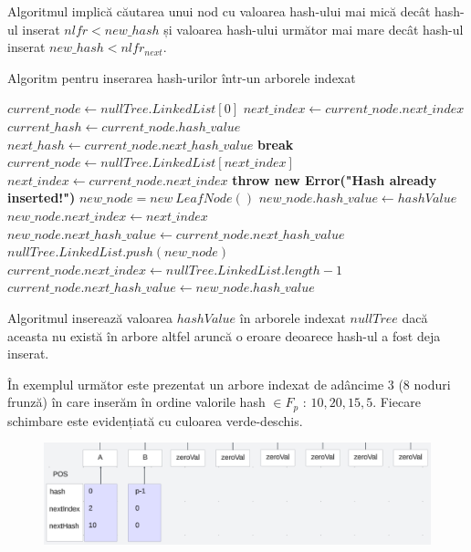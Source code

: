 \documentclass[12pt, letterpaper]{article}
\begin{document}
Algoritmul implică căutarea unui nod cu valoarea hash-ului mai mică decât hash-ul inserat $nlfr < new\_hash$ și valoarea hash-ului următor mai mare decât hash-ul inserat $new\_hash < nlfr_{next}$.

\begin{algorithm}
    \caption{Algoritm pentru inserarea hash-urilor într-un arborele indexat}
    \label{index_tree_hash_insert_alg}
    \begin{algorithmic}[1]
            \State $current\_node \gets nullTree.LinkedList[0]$
            \State $next\_index \gets current\_node.next\_index$ 
                \State $current\_hash \gets current\_node.hash\_value$
                \State $next\_hash \gets current\_node.next\_hash\_value$
                  \State \textbf{break}
                \Else 
                \State $current\_node\gets nullTree.LinkedList[next\_index]$
                \State $next\_index \gets current\_node.next\_index$ 
                \EndIf
            \EndWhile
                \State \textbf{throw new Error("Hash already inserted!")}
            \Else 
                \State $new\_node = new\ LeafNode()$
                \State $new\_node.hash\_value\gets hashValue$
                \State $new\_node.next\_index\gets next\_index$
                \State $new\_node.next\_hash\_value\gets current\_node.next\_hash\_value$
                \State $nullTree.LinkedList.push(new\_node)$
                \State $current\_node.next\_index\gets nullTree.LinkedList.length-1$
                \State $current\_node.next\_hash\_value\gets new\_node.hash\_value$      
            \EndIf
        \EndFunction
    \end{algorithmic}
\end{algorithm}

Algoritmul inserează valoarea $hashValue$ în arborele indexat $nullTree$ dacă aceasta nu există în arbore altfel aruncă o eroare deoarece hash-ul a fost deja inserat.

În exemplul următor este prezentat un arbore indexat de adâncime 3 (8 noduri frunză) în care inserăm în ordine valorile hash $\in F_p$ : $10,20,15,5$. Fiecare schimbare este evidențiată cu culoarea verde-deschis.

\begin{figure}[ht]
    \centering
    \includegraphics[width=1\textwidth]{images/nullTreeInsert/nullTreeInsertInitial.png}
    \label{fig:nullTreeInsertInitial}
\end{figure}
\end{document}
